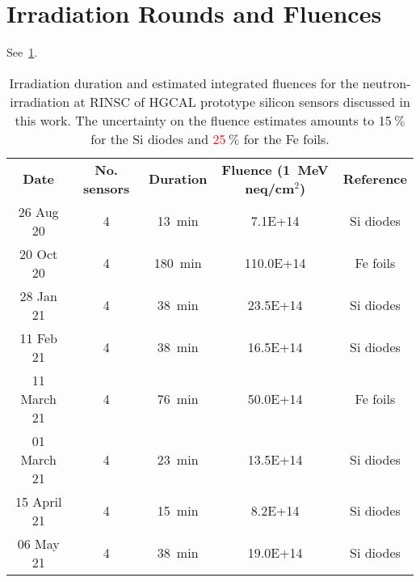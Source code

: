 \section{Irradiation Rounds and Fluences}
\label{appendix:irrad_rounds}
See~\ref{table:irrads}.
\begin{table}[h]
	\centering
	\begin{tabular}{c|cccc}
		\textbf{Date} & \textbf{No. sensors} & \textbf{Duration} & \textbf{Fluence (\SI{1}{\mega\eV} neq/cm$^2$)} & \textbf{Reference} \\
		26 Aug 20 & 4 & \SI{13}{\minute} & 7.1E+14 & Si diodes \\
		20 Oct 20 & 4 & \SI{180}{\minute} & 110.0E+14 & Fe foils \\
		28 Jan 21 & 4 & \SI{38}{\minute} & 23.5E+14 & Si diodes \\
		11 Feb 21 & 4 & \SI{38}{\minute} & 16.5E+14 & Si diodes \\
		11 March 21 & 4 & \SI{76}{\minute} & 50.0E+14 & Fe foils \\
		01 March 21 & 4 & \SI{23}{\minute} & 13.5E+14 & Si diodes \\
		15 April 21 & 4 & \SI{15}{\minute} & 8.2E+14 & Si diodes \\
		06 May 21 & 4 & \SI{38}{\minute} & 19.0E+14 & Si diodes \\
	\end{tabular}
	\caption{Irradiation duration and estimated integrated fluences for the neutron-irradiation at RINSC of HGCAL prototype silicon sensors discussed in this work.
	The uncertainty on the fluence estimates amounts to 15$~\%$ for the Si diodes and \textcolor{red}{25}$~\%$ for the Fe foils.
	}
	\label{table:irrads}
\end{table}


